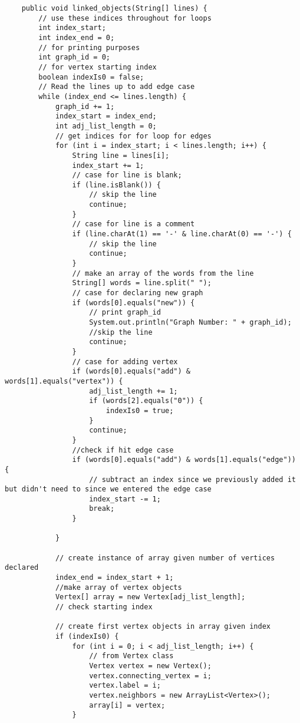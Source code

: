 \documentclass{article}
\begin{document}
\begin{lstlisting}
    public void linked_objects(String[] lines) {
        // use these indices throughout for loops
        int index_start;
        int index_end = 0;
        // for printing purposes
        int graph_id = 0;
        // for vertex starting index
        boolean indexIs0 = false;
        // Read the lines up to add edge case
        while (index_end <= lines.length) {
            graph_id += 1;
            index_start = index_end;
            int adj_list_length = 0;
            // get indices for for loop for edges
            for (int i = index_start; i < lines.length; i++) {
                String line = lines[i];
                index_start += 1;
                // case for line is blank;
                if (line.isBlank()) {
                    // skip the line
                    continue;
                }
                // case for line is a comment
                if (line.charAt(1) == '-' & line.charAt(0) == '-') {
                    // skip the line
                    continue;
                }
                // make an array of the words from the line
                String[] words = line.split(" ");
                // case for declaring new graph
                if (words[0].equals("new")) {
                    // print graph_id
                    System.out.println("Graph Number: " + graph_id);
                    //skip the line
                    continue;
                }
                // case for adding vertex
                if (words[0].equals("add") & words[1].equals("vertex")) {
                    adj_list_length += 1;
                    if (words[2].equals("0")) {
                        indexIs0 = true;
                    }
                    continue;
                }
                //check if hit edge case
                if (words[0].equals("add") & words[1].equals("edge")) {
                    // subtract an index since we previously added it but didn't need to since we entered the edge case
                    index_start -= 1;
                    break;
                }

            }

            // create instance of array given number of vertices declared
            index_end = index_start + 1;
            //make array of vertex objects
            Vertex[] array = new Vertex[adj_list_length];
            // check starting index

            // create first vertex objects in array given index
            if (indexIs0) {
                for (int i = 0; i < adj_list_length; i++) {
                    // from Vertex class
                    Vertex vertex = new Vertex();
                    vertex.connecting_vertex = i;
                    vertex.label = i;
                    vertex.neighbors = new ArrayList<Vertex>();
                    array[i] = vertex;
                }


\end{lstlisting}
\end{document}

